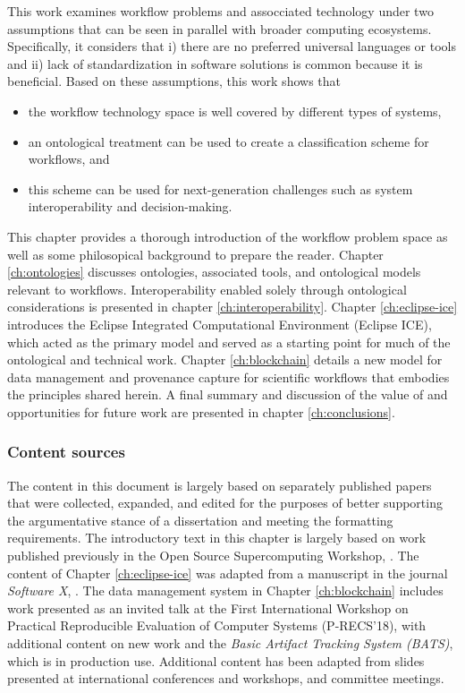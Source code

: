 This work examines workflow problems and assocciated technology under two
assumptions that can be seen in parallel with broader
computing ecosystems. Specifically, it considers that i) there are no preferred
universal languages or tools and ii) lack of standardization
in software solutions is common because it is beneficial. Based
on these assumptions, this work shows that 
\begin{itemize}
  \item the workflow technology space is well covered by different types
  of systems,
  \item an ontological treatment can be used to create a classification scheme
  for workflows, and
  \item this scheme can be used for next-generation challenges such as system
  interoperability and decision-making.
\end{itemize}

This chapter provides a thorough introduction of the workflow problem
space as well as some philosopical background to prepare the reader. Chapter
\ref{ch:ontologies} discusses ontologies, associated tools, and ontological
models relevant to workflows. Interoperability enabled solely through
ontological considerations is presented in chapter
\ref{ch:interoperability}. Chapter \ref{ch:eclipse-ice} introduces the
Eclipse Integrated Computational Environment (Eclipse ICE), which acted as the
primary model and served as a starting point for much of the
ontological and technical work. Chapter \ref{ch:blockchain} details a new model
for data management and provenance capture for scientific workflows that
embodies the principles shared herein. A final summary and discussion of the
value of and opportunities for future work are presented in chapter
\ref{ch:conclusions}.

\subsubsection{Content sources}

The content in this document is largely based on separately published papers
that were collected, expanded, and edited for the purposes of better supporting
the argumentative stance of a dissertation and meeting the formatting
requirements. The introductory text in this chapter is largely based on
work published previously in the Open Source Supercomputing Workshop,
\cite{billings_toward_2017}. The content of Chapter \ref{ch:eclipse-ice} was
adapted from a manuscript in the journal \textit{Software X},
\cite{billings_eclipse_2017}. The data management system in Chapter
\ref{ch:blockchain} includes work presented as an invited talk at the First
International Workshop on Practical Reproducible Evaluation of Computer Systems
(P-RECS'18), with additional content on new work and the
\textit{Basic Artifact Tracking System (BATS)}, which is in production
use. Additional content has been adapted from slides presented at international
conferences and workshops, and committee meetings.

